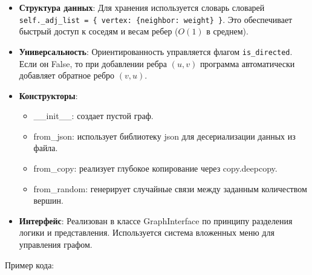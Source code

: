 \documentclass[referat]{SCWorks}
\begin{document}
    \begin{itemize}
        \item \textbf{Структура данных}: Для хранения используется словарь словарей
        \verb|self._adj_list = { vertex: {neighbor: weight} }|.
        Это обеспечивает быстрый доступ к соседям и весам ребер ($O(1)$ в среднем).


        \item \textbf{Универсальность}: Ориентированность управляется флагом \verb|is_directed|.
        Если он False, то при добавлении ребра $(u, v)$ программа автоматически добавляет обратное ребро $(v, u)$.


        \item \textbf{Конструкторы}:

        \begin{itemize}
            \item \_\_init\_\_: создает пустой граф.


            \item from\_json: использует библиотеку json для десериализации данных из файла.


            \item from\_copy: реализует глубокое копирование через copy.deepcopy.


            \item from\_random: генерирует случайные связи между заданным количеством вершин.


        \end{itemize}

        \item \textbf{Интерфейс}: Реализован в классе GraphInterface по принципу разделения логики и представления. Используется система вложенных меню для управления графом.


    \end{itemize}
    Пример кода:
\end{document}
